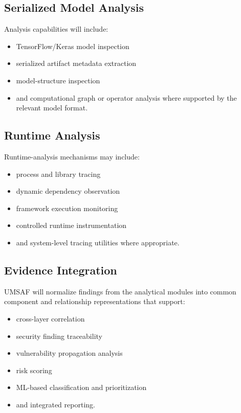 \documentclass[
  12pt,
  letterpaper,
  oneside]{report}
\providecommand{\tightlist}{%
  \setlength{\itemsep}{0pt}\setlength{\parskip}{0pt}}
\begin{document}
\subsection{Serialized Model Analysis}\label{serialized-model-analysis}

Analysis capabilities will include:

\begin{itemize}
\tightlist
\item
  TensorFlow/Keras model inspection
\item
  serialized artifact metadata extraction
\item
  model-structure inspection
\item
  and computational graph or operator analysis where supported by the
  relevant model format.
\end{itemize}

\subsection{Runtime Analysis}\label{runtime-analysis}

Runtime-analysis mechanisms may include:

\begin{itemize}
\tightlist
\item
  process and library tracing
\item
  dynamic dependency observation
\item
  framework execution monitoring
\item
  controlled runtime instrumentation
\item
  and system-level tracing utilities where appropriate.
\end{itemize}

\subsection{Evidence Integration}\label{evidence-integration}

UMSAF will normalize findings from the analytical modules into common
component and relationship representations that support:

\begin{itemize}
\tightlist
\item
  cross-layer correlation
\item
  security finding traceability
\item
  vulnerability propagation analysis
\item
  risk scoring
\item
  ML-based classification and prioritization
\item
  and integrated reporting.
\end{itemize}
\end{document}
